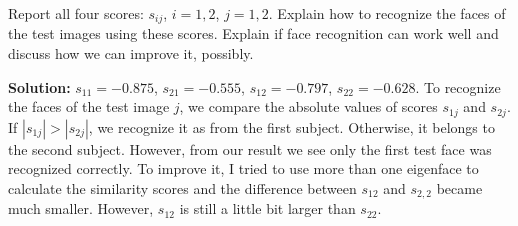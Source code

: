 \documentclass[twoside,12pt]{article}
\begin{document}
\begin{enumerate}
Report all four scores: $s_{ij}$, $i = 1, 2$, $j = 1, 2.$ Explain how to recognize the faces of the test images using these scores. Explain if face recognition can work well and discuss how we can improve it, possibly. 
\begin{tcolorbox}
\textbf{Solution:} $s_{11} = -0.875$, $s_{21} = -0.555$, $s_{12} = -0.797$, $s_{22} = -0.628$. To recognize the faces of the test image $j$, we compare the absolute values of scores $s_{1j}$ and $s_{2j}$. If $|s_{1j}| > |s_{2j}|$, we recognize it as from the first subject. Otherwise, it belongs to the second subject. However, from our result we see only the first test face was recognized correctly. To improve it, I tried to use more than one eigenface to calculate the similarity scores and the difference between $s_{12}$ and $s_{2,2}$ became much smaller. However, $s_{12}$ is still a little bit larger than $s_{22}$. 
\end{tcolorbox}

\end{enumerate}
\end{document}
